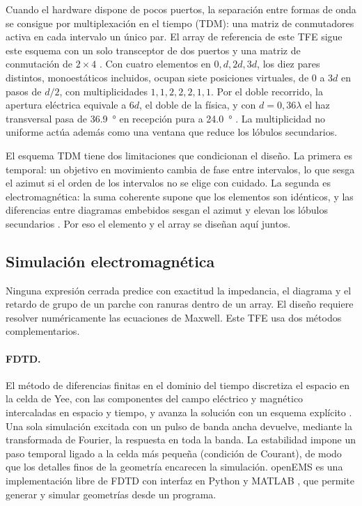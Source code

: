 \documentclass[11pt,a4paper]{article}
\begin{document}
Cuando el hardware dispone de pocos puertos, la separación entre formas de onda se consigue por
multiplexación en el tiempo (TDM): una matriz de conmutadores activa en cada intervalo un único
par. El array de referencia de este TFE sigue este esquema con un solo transceptor de dos puertos
y una matriz de conmutación de $2 \times 4$ \cite{carretero2027vpa}. Con cuatro elementos en
$0, d, 2d, 3d$, los diez pares distintos, monoestáticos incluidos, ocupan siete posiciones
virtuales, de $0$ a $3d$ en pasos de $d/2$, con multiplicidades $1, 1, 2, 2, 2, 1, 1$. Por el
doble recorrido, la apertura eléctrica equivale a $6d$, el doble de la física, y con
$d = 0{,}36\lambda$ el haz transversal pasa de \SI{36.9}{\degree} en recepción pura a
\SI{24.0}{\degree} \cite{carretero2027vpa}. La multiplicidad no uniforme actúa además como una
ventana que reduce los lóbulos secundarios.

El esquema TDM tiene dos limitaciones que condicionan el diseño. La primera es temporal: un
objetivo en movimiento cambia de fase entre intervalos, lo que sesga el azimut si el orden de los
intervalos no se elige con cuidado. La segunda es electromagnética: la suma coherente supone que
los elementos son idénticos, y las diferencias entre diagramas embebidos sesgan el azimut y elevan
los lóbulos secundarios \cite{carretero2027vpa}. Por eso el elemento y el array se diseñan aquí
juntos.

\subsection{Simulación electromagnética}\label{sec:simulacion}
Ninguna expresión cerrada predice con exactitud la impedancia, el diagrama y el retardo de grupo
de un parche con ranuras dentro de un array. El diseño requiere resolver numéricamente las
ecuaciones de Maxwell. Este TFE usa dos métodos complementarios.

\paragraph{FDTD.} El método de diferencias finitas en el dominio del tiempo discretiza el espacio
en la celda de Yee, con las componentes del campo eléctrico y magnético intercaladas en espacio y
tiempo, y avanza la solución con un esquema explícito \cite{yee1966numerical, taflove2005fdtd}.
Una sola simulación excitada con un pulso de banda ancha devuelve, mediante la transformada de
Fourier, la respuesta en toda la banda. La estabilidad impone un paso temporal ligado a la celda
más pequeña (condición de Courant), de modo que los detalles finos de la geometría encarecen la
simulación. openEMS es una implementación libre de FDTD con interfaz en Python y MATLAB
\cite{liebig2013openems}, que permite generar y simular geometrías desde un programa.
\end{document}
